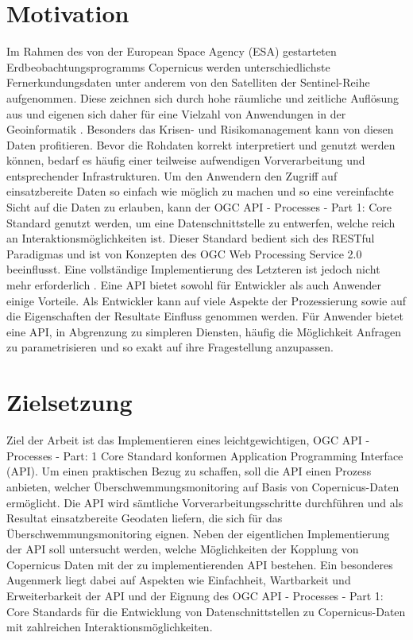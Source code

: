 \newpage
\restoregeometry
{}

\section{Motivation}
\label{s:Einleitung}
Im Rahmen des von der European Space Agency (ESA) gestarteten Erdbeobachtungsprogramms Copernicus werden unterschiedlichste Fernerkundungsdaten unter anderem von den 
Satelliten der Sentinel-Reihe aufgenommen. Diese zeichnen sich durch hohe räumliche und zeitliche Auflösung aus und eigenen sich daher für eine Vielzahl von Anwendungen 
in der Geoinformatik \cite{s1_product_definition}. Besonders das Krisen- und Risikomanagement kann von diesen Daten profitieren. Bevor die Rohdaten korrekt interpretiert 
und genutzt werden können, bedarf es häufig einer teilweise aufwendigen Vorverarbeitung und entsprechender Infrastrukturen. Um den Anwendern den Zugriff 
auf einsatzbereite Daten so einfach wie möglich zu machen und so eine vereinfachte Sicht auf die Daten zu erlauben, kann der OGC API - Processes - Part 1: Core Standard 
genutzt werden, um eine Datenschnittstelle zu entwerfen, welche reich an Interaktionsmöglichkeiten ist. Dieser Standard bedient sich des RESTful Paradigmas und ist von
Konzepten des OGC Web Processing Service 2.0 beeinflusst. Eine vollständige Implementierung des Letzteren ist jedoch nicht mehr erforderlich \cite{ogc_api_processes_core}. 
Eine API bietet sowohl für Entwickler als auch Anwender einige Vorteile. Als Entwickler kann auf viele Aspekte der Prozessierung sowie auf die Eigenschaften der Resultate Einfluss 
genommen werden. Für Anwender bietet eine API, in Abgrenzung zu simpleren Diensten, häufig die Möglichkeit Anfragen zu parametrisieren und so exakt auf ihre Fragestellung anzupassen.

\section{Zielsetzung}
\label{s:Zielsetzung}
Ziel der Arbeit ist das Implementieren eines leichtgewichtigen, OGC API - Processes - Part: 1 Core Standard konformen Application Programming Interface (API). Um einen 
praktischen Bezug zu schaffen, soll die API einen Prozess anbieten, welcher Überschwemmungsmonitoring auf Basis von Copernicus-Daten ermöglicht. Die API wird sämtliche 
Vorverarbeitungsschritte durchführen und als Resultat einsatzbereite Geodaten liefern, die sich für das Überschwemmungsmonitoring eignen. Neben der eigentlichen Implementierung 
der API soll untersucht werden, welche Möglichkeiten der Kopplung von Copernicus Daten mit der zu implementierenden API bestehen. Ein besonderes Augenmerk liegt dabei auf 
Aspekten wie Einfachheit, Wartbarkeit und Erweiterbarkeit der API und der Eignung des OGC API - Processes - Part 1: Core Standards für die Entwicklung von Datenschnittstellen 
zu Copernicus-Daten mit zahlreichen Interaktionsmöglichkeiten. 

